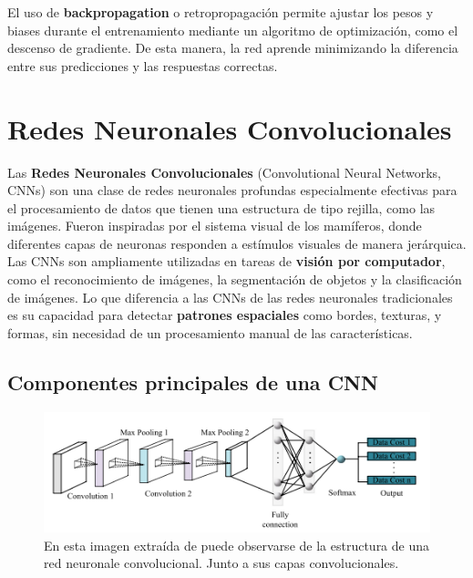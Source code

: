 El uso de \textbf{backpropagation} o retropropagación permite ajustar los pesos y biases durante el entrenamiento
mediante un algoritmo de optimización, como el descenso de gradiente.
De esta manera, la red aprende minimizando la diferencia entre sus predicciones y las respuestas correctas.
\section{Redes Neuronales Convolucionales}\label{sec:redes-neuronales-convolucionales}
Las \textbf{Redes Neuronales Convolucionales} (Convolutional Neural Networks, CNNs) son una clase de redes neuronales
profundas especialmente efectivas para el procesamiento de datos que tienen una estructura de tipo rejilla, como las
imágenes.
Fueron inspiradas por el sistema visual de los mamíferos, donde diferentes capas de neuronas responden a estímulos
visuales de manera jerárquica. \\[2pt]

Las CNNs son ampliamente utilizadas en tareas de \textbf{visión por computador}, como el reconocimiento de imágenes, la
segmentación de objetos y la clasificación de imágenes.
Lo que diferencia a las CNNs de las redes neuronales tradicionales es su capacidad para detectar
\textbf{patrones espaciales} como bordes, texturas, y formas, sin necesidad de un procesamiento manual de las
características.


\subsection{Componentes principales de una CNN}\label{subsec:componentes-principales-de-una-cnn}
\begin{figure}[htp] \label{fig:convolution-layer}
    \begin{center}
        \includegraphics[width=1\textwidth]{imagenes/convolution_layer}
    \end{center}
    \caption[Puntos globales y locales]{En esta imagen extraída de
    \cite{A review of convolutional neural networks in computer vision} puede observarse de la estructura de una red
    neuronale convolucional. Junto a sus capas convolucionales. }
\end{figure}

